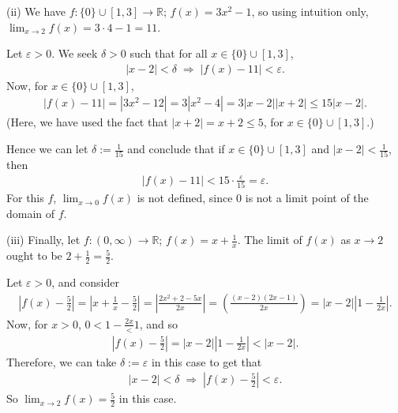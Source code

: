 \documentclass[letterpaper,10pt,english]{jupyterBook}
\begin{document}
\sphinxAtStartPar
(ii) We have \(f:\{0\}\cup[1,3]\to\mathbb{R}\); \(f(x)=3x^2-1\), so using intuition only, \(\lim_{x\rightarrow 2} f(x)=3\cdot 4-1=11\).

\sphinxAtStartPar
Let \(\varepsilon>0\). We seek \(\delta>0\) such that for all \(x\in\{0\}\cup[1,3]\),
\begin{equation*}
\begin{split}
|x-2|<\delta \; \Rightarrow \; |f(x)-11|<\varepsilon.
\end{split}
\end{equation*}
\sphinxAtStartPar
Now, for \(x\in\{0\}\cup[1,3]\),
\begin{equation*}
\begin{split}
|f(x)-11| = |3x^2-12| = 3|x^2-4| = 3|x-2||x+2| \leq 15|x-2|.
\end{split}
\end{equation*}
\sphinxAtStartPar
(Here, we have used the fact that \(|x+2| = x+2 \leq 5\), for \(x\in\{0\}\cup[1,3]\).)

\sphinxAtStartPar
Hence we can let \(\delta:=\frac{1}{15}\) and conclude that if \(x\in\{0\}\cup[1,3]\) and \(|x-2|<\frac{1}{15}\), then
\begin{equation*}
\begin{split}
|f(x)-11|<15\cdot\frac{\varepsilon}{15} =\varepsilon.
\end{split}
\end{equation*}
\sphinxAtStartPar
For this \(f\), \(\lim_{x\rightarrow 0}f(x)\) is not defined, since \(0\) is not a limit point of the domain of \(f\).

\sphinxAtStartPar
(iii) Finally, let \(f:(0,\infty)\to\mathbb{R}\); \(f(x)=x+\frac{1}{x}\). The limit of \(f(x)\) as \(x\rightarrow 2\) ought to be \(2+\frac{1}{2}=\frac{5}{2}\).

\sphinxAtStartPar
Let \(\varepsilon>0\), and consider
\begin{equation*}
\begin{split}
\left|f(x)-\frac{5}{2}\right| = \left|x+\frac{1}{x}-\frac{5}{2}\right| = \left|\frac{2x^2+2-5x}{2x}\right| = \left(\frac{(x-2)(2x-1)}{2x}\right) = |x-2|\left|1-\frac{1}{2x}\right|.
\end{split}
\end{equation*}
\sphinxAtStartPar
Now, for \(x>0\), \(0<1-\frac{2x}<1\), and so
\begin{equation*}
\begin{split}
\left|f(x)-\frac{5}{2}\right| = |x-2|\left|1-\frac{1}{2x}\right| < |x-2|.
\end{split}
\end{equation*}
\sphinxAtStartPar
Therefore, we can take \(\delta:=\varepsilon\) in this case to get that
\begin{equation*}
\begin{split}
|x-2|<\delta \; \Rightarrow \; \left|f(x)-\frac{5}{2}\right|<\varepsilon.
\end{split}
\end{equation*}
\sphinxAtStartPar
So \(\lim_{x\rightarrow 2}f(x)=\frac{5}{2}\) in this case.
\end{document}
